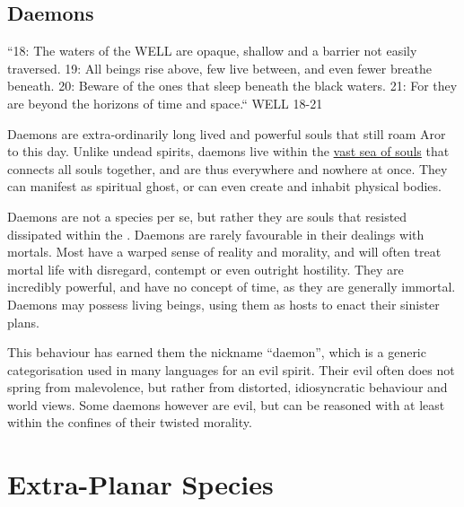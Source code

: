 \subsection{Daemons}
\label{sec:Daemons}

\begin{displayquote}
  ``18: The waters of the WELL are opaque, shallow and a barrier not easily
  traversed. 19: All beings rise above, few live between, and even fewer breathe
  beneath. 20: Beware of the ones that sleep beneath the black waters. 21: For
  they are beyond the horizons of time and space.`` WELL 18-21
\end{displayquote}

Daemons are extra-ordinarily long lived and powerful souls that still roam Aror
to this day. Unlike undead spirits, daemons live within the \hyperref[sec:Soul
  Well]{vast sea of souls} that connects all souls together, and are thus
everywhere and nowhere at once. They can manifest as spiritual ghost, or can
even create and inhabit physical bodies.

Daemons are not a species per se, but rather they are souls that resisted
dissipated within the . Daemons are rarely favourable
in their dealings with mortals. Most have a warped sense of reality and
morality, and will often treat mortal life with disregard, contempt or even
outright hostility. They are incredibly powerful, and have no concept of time,
as they are generally immortal. Daemons may possess living beings, using them
as hosts to enact their sinister plans.

This behaviour has earned them the nickname ``daemon'', which is a generic
categorisation used in many languages for an evil spirit. Their evil often
does not spring from malevolence, but rather from distorted, idiosyncratic
behaviour and world views. Some daemons however are evil, but can be reasoned
with at least within the confines of their twisted morality.








\section{Extra-Planar Species}
\label{sec:ExtraPlanar Species}

